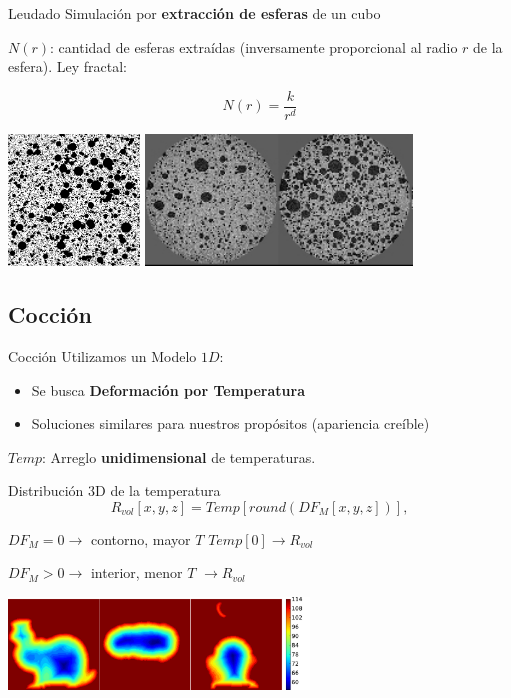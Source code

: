 \documentclass[spanish,unknownkeysallowed,10pt]{beamer}
\begin{document}
\begin{frame}{Leudado}
Simulación por \textbf{extracción de esferas} de un cubo

$N(r)$: cantidad de esferas extraídas (inversamente proporcional al radio $r$ de la esfera). Ley fractal:

\begin{equation*}
N(r) = \frac{k}{r^{d}}
\end{equation*}

\vspace{0.3cm}
\centering
\includegraphics[height=3.5cm]{../figures/bubbles}
\includegraphics[height=3.5cm]{../figures/proving}
\end{frame}


\subsection{Cocción}

\begin{frame}{Cocción}
Utilizamos un Modelo $1D$:
\begin{itemize}
\item Se busca \textbf{Deformación por Temperatura}
\item Soluciones similares para nuestros propósitos (apariencia creíble)
\end{itemize}

$Temp$: Arreglo \textbf{unidimensional} de temperaturas.

Distribución 3D de la temperatura
\begin{equation*}
\displaystyle R_{vol}[x,y,z] = Temp[ round( DF_{M}[x,y,z] ) ], 
\end{equation*}

$DF_{M} = 0 \rightarrow$ contorno, mayor $T$ $Temp[0] \rightarrow R_{vol}$

$DF_{M} > 0 \rightarrow$ interior, menor $T$  $\rightarrow R_{vol}$

\centerline{\includegraphics[width=8cm]{../figures/tempsbunny}}
\end{frame}
\end{document}
